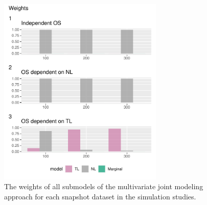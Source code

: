 \documentclass[12pt]{article}
\begin{document}
\newpage
\begin{figure}[H]
\centering
\includegraphics[width=0.7\textwidth]{img/Weights_simulation.pdf}
\caption{The weights of all submodels of the multivariate joint modeling approach for each snapshot dataset in the simulation studies.\label{fig:weights_simulation}}
\end{figure}

\newpage










%

%
\end{document}
